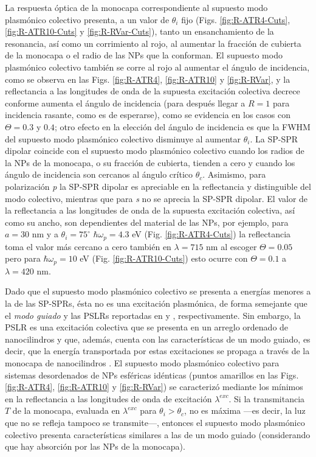 La respuesta óptica de la monocapa correspondiente al supuesto modo plasmónico colectivo presenta, a un valor de $\theta_i$ fijo (Figs. \ref{fig:R-ATR4-Cuts}, \ref{fig:R-ATR10-Cuts} y \ref{fig:R-RVar-Cuts}), tanto un ensanchamiento de la resonancia, así como un corrimiento al rojo, al aumentar la fracción de cubierta de la monocapa o el radio de las NPs que la conforman. El supuesto modo plasmónico colectivo también se corre al rojo al aumentar el ángulo de incidencia, como se observa en las Figs. \ref{fig:R-ATR4}, \ref{fig:R-ATR10} y \ref{fig:R-RVar}, y la reflectancia a las longitudes de onda de la supuesta excitación colectiva decrece conforme aumenta el ángulo de incidencia (para después llegar a $R=1$ para incidencia rasante, como es de esperarse), como se evidencia en los casos con $\Theta=0.3$ y $0.4$; otro efecto en la elección del ángulo de incidencia es que la FWHM del supuesto modo plasmónico colectivo disminuye al aumentar $\theta_i$. La SP-SPR dipolar coincide con el supuesto modo plasmónico colectivo cuando los radios de la NPs de la monocapa, o su fracción de cubierta, tienden a cero y cuando los ángulo de incidencia son cercanos al ángulo crítico $\theta_c$. Asimismo, para polarización \emph{p} la SP-SPR dipolar es apreciable en la reflectancia y distinguible del modo colectivo, mientras que para \emph{s} no se aprecia la SP-SPR dipolar. El valor de la reflectancia a las longitudes de onda de la supuesta excitación colectiva, así como su ancho, son dependientes del material de las NPs, por ejemplo, para  $a=30$ nm y a $\theta_i=75^\circ$ $\hbar\omega_p=4.3$ eV (Fig. \ref{fig:R-ATR4-Cuts}) la reflectancia toma el valor más cercano a cero también en $\lambda=715$ nm al escoger  $\Theta=0.05$ pero para $\hbar\omega_p=10$ eV (Fig. \ref{fig:R-ATR10-Cuts}) esto ocurre con $\Theta=0.1$ a $\lambda=420$ nm. 

 Dado que el supuesto modo plasmónico colectivo se presenta a energías menores a la de las SP-SPRs, ésta no es una excitación plasmónica, de forma semejante que el \emph{modo guiado} y las PSLRs reportadas en  \cite{kabashin2009plasmonic} y \cite{danilov2018ultra}, respectivamente. Sin embargo, la PSLR es una excitación colectiva que se presenta en un arreglo ordenado de nanocilindros \cite{kabashin2009plasmonic} y \cite{danilov2018ultra} que, además, cuenta con las características de un modo guiado, es decir, que la energía transportada por estas excitaciones se propaga a través de la monocapa de nanocilindros \cite{kabashin2009plasmonic}. El supuesto modo plasmónico colectivo  para sistemas desordenados de NPs esféricas idénticas (puntos amarillos en las Figs. \ref{fig:R-ATR4}, \ref{fig:R-ATR10} y \ref{fig:R-RVar}) se caracterizó mediante los mínimos en la reflectancia a las  longitudes de onda de excitación $\lambda^{exc}$. Si la transmitancia $T$ de la monocapa, evaluada en $\lambda^{exc}$ para $\theta_i>\theta_c$, no es máxima ---es decir, la luz que no se refleja tampoco se transmite---, entonces el supuesto modo plasmónico colectivo presenta características similares a las de un modo guiado (considerando que hay absorción por las NPs de la monocapa).

